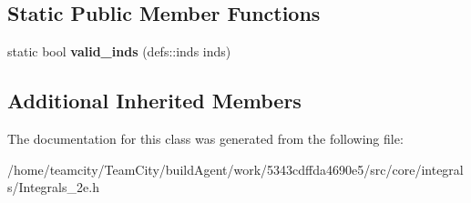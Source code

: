 \subsection*{Static Public Member Functions}
\begin{DoxyCompactItemize}
\item 
static bool {\bfseries valid\+\_\+inds} (defs\+::inds inds)\hypertarget{classIntegrals__2e_abee154b83d33485a1775937f307d7120}{}\label{classIntegrals__2e_abee154b83d33485a1775937f307d7120}

\end{DoxyCompactItemize}
\subsection*{Additional Inherited Members}


The documentation for this class was generated from the following file\+:\begin{DoxyCompactItemize}
\item 
/home/teamcity/\+Team\+City/build\+Agent/work/5343cdffda4690e5/src/core/integrals/Integrals\+\_\+2e.\+h\end{DoxyCompactItemize}
